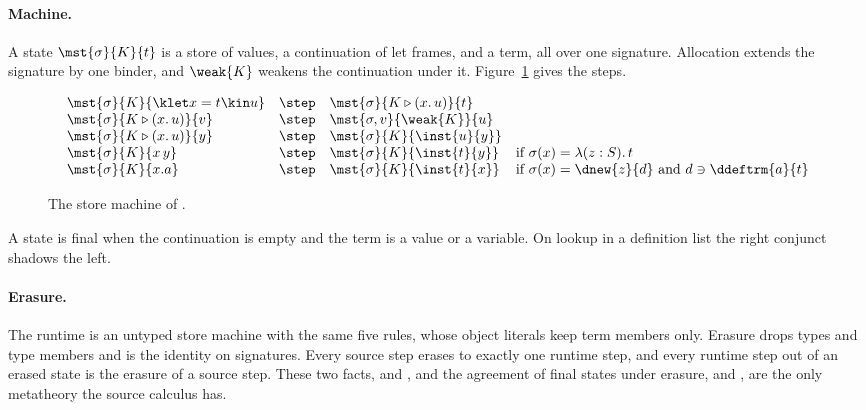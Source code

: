 \paragraph{Machine.}
A state $\mst{\sigma}{K}{t}$ is a store of values, a continuation of let frames, and a term, all over one signature. Allocation extends the signature by one binder, and $\weak{K}$ weakens the continuation under it. Figure~\ref{fig:source-machine} gives the steps.
\begin{figure}
\small
\color{srccol}
\[
\begin{array}{@{}lcll@{}}
\mst{\sigma}{K}{\klet x = t \kin u} &\step& \mst{\sigma}{K \triangleright (x.\,u)}{t} \\
\mst{\sigma}{K \triangleright (x.\,u)}{v} &\step& \mst{\sigma, v}{\weak{K}}{u} \\
\mst{\sigma}{K \triangleright (x.\,u)}{y} &\step& \mst{\sigma}{K}{\inst{u}{y}} \\
\mst{\sigma}{K}{x\,y} &\step& \mst{\sigma}{K}{\inst{t}{y}} & \text{if } \sigma(x) = \lambda(z : S).\,t \\
\mst{\sigma}{K}{x.a} &\step& \mst{\sigma}{K}{\inst{t}{x}} & \text{if } \sigma(x) = \dnew{z}{d} \text{ and } d \ni \ddeftrm{a}{t}
\end{array}
\]
\color{black}
\caption{The store machine of \DOTMNF.}
\label{fig:source-machine}
\end{figure}
A state is final when the continuation is empty and the term is a value or a variable. On lookup in a definition list the right conjunct shadows the left.

\paragraph{Erasure.}
The runtime is an untyped store machine with the same five rules, whose object literals keep term members only. Erasure drops types and type members and is the identity on signatures. Every source step erases to exactly one runtime step, and every runtime step out of an erased state is the erasure of a source step. These two facts,  and , and the agreement of final states under erasure,  and , are the only metatheory the source calculus has.

